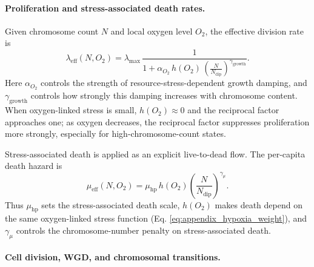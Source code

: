 \documentclass[11pt]{article}
\begin{document}
\paragraph{Proliferation and stress-associated death rates.}

Given chromosome count $N$ and local oxygen level $O_2$, the effective division rate is
\begin{equation}
\lambda_{\mathrm{eff}}(N,O_2)
=
\lambda_{\max}\,
\frac{1}{1+\alpha_{O_2}\,h(O_2)\,
\left(\frac{N}{N_{\mathrm{dip}}}\right)^{\gamma_{\mathrm{growth}}}}.
\label{eq:appendix_lambda_eff_soft}
\end{equation}
Here $\alpha_{O_2}$ controls the strength of resource-stress-dependent growth damping, and $\gamma_{\mathrm{growth}}$ controls how strongly this damping increases with chromosome content. When oxygen-linked stress is small, $h(O_2)\approx 0$ and the reciprocal factor approaches one; as oxygen decreases, the reciprocal factor suppresses proliferation more strongly, especially for high-chromosome-count states.

Stress-associated death is applied as an explicit live-to-dead flow. The per-capita death hazard is
\begin{equation}
\mu_{\mathrm{eff}}(N,O_2)
=
\mu_{\mathrm{hp}}\,
h(O_2)
\left(\frac{N}{N_{\mathrm{dip}}}\right)^{\gamma_\mu}.
\label{eq:appendix_mu_soft}
\end{equation}
Thus $\mu_{\mathrm{hp}}$ sets the stress-associated death scale, $h(O_2)$ makes death depend on the same oxygen-linked stress function (Eq. \eqref{eq:appendix_hypoxia_weight}), and $\gamma_\mu$ controls the chromosome-number penalty on stress-associated death.

\paragraph{Cell division, WGD, and chromosomal transitions.}
\end{document}
